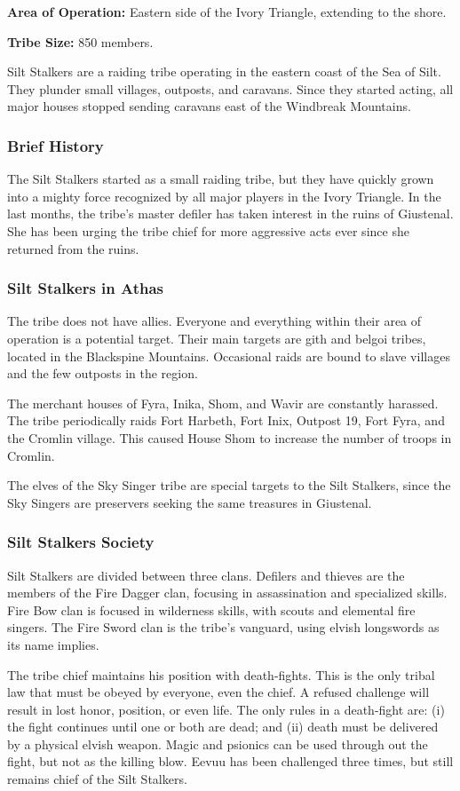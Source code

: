 \textbf{Area of Operation:} Eastern side of the Ivory Triangle, extending to the shore.

\textbf{Tribe Size:} 850 members.

Silt Stalkers are a raiding tribe operating in the eastern coast of the Sea of Silt. They plunder small villages, outposts, and caravans. Since they started acting, all major houses stopped sending caravans east of the Windbreak Mountains.

\subsubsection{Brief History}
The Silt Stalkers started as a small raiding tribe, but they have quickly grown into a mighty force recognized by all major players in the Ivory Triangle. In the last months, the tribe's master defiler has taken interest in the ruins of Giustenal. She has been urging the tribe chief for more aggressive acts ever since she returned from the ruins.

\subsubsection{Silt Stalkers in Athas}
The tribe does not have allies. Everyone and everything within their area of operation is a potential target. Their main targets are gith and belgoi tribes, located in the Blackspine Mountains. Occasional raids are bound to slave villages and the few outposts in the region.

The merchant houses of Fyra, Inika, Shom, and Wavir are constantly harassed. The tribe periodically raids Fort Harbeth, Fort Inix, Outpost 19, Fort Fyra, and the Cromlin village. This caused House Shom to increase the number of troops in Cromlin.

The elves of the Sky Singer tribe are special targets to the Silt Stalkers, since the Sky Singers are preservers seeking the same treasures in Giustenal.

\subsubsection{Silt Stalkers Society}
Silt Stalkers are divided between three clans. Defilers and thieves are the members of the Fire Dagger clan, focusing in assassination and specialized skills. Fire Bow clan is focused in wilderness skills, with scouts and elemental fire singers. The Fire Sword clan is the tribe's vanguard, using elvish longswords as its name implies.

The tribe chief maintains his position with death-fights. This is the only tribal law that must be obeyed by everyone, even the chief. A refused challenge will result in lost honor, position, or even life. The only rules in a death-fight are: (i) the fight continues until one or both are dead; and (ii) death must be delivered by a physical elvish weapon. Magic and psionics can be used through out the fight, but not as the killing blow. Eevuu has been challenged three times, but still remains chief of the Silt Stalkers.
